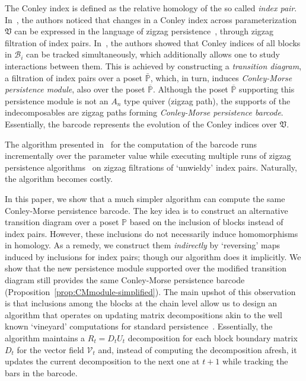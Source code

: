 \documentclass[letterpaper,11pt]{article}
\theoremstyle{plain}
\theoremstyle{definition}
\def\cB{\text{$\mathcal B$}}
\def\cV{\text{$\mathcal V$}}
\def\mathobj#1{\mbox{$#1$}}
\def\PP{\mathobj{\mathbb{P}}}
\newcounter{li}
\newcommand{\zzV}{\mathfrak{V}}
\begin{document}
The Conley index is defined as the relative homology of the so called \emph{index pair}. 
In~\cite{DeLiMrSl2022}, the authors noticed that changes in a Conley index across parameterization $\zzV$ can be expressed in the language of zigzag persistence~\cite{CaSiMo2009-zigzag}, through zigzag filtration of index pairs.
In~\cite{CMbarcodes2025}, the authors showed that Conley indices of all blocks in $\cB_i$ can be tracked simultaneously, which additionally allows one to study interactions between them.
This is achieved by constructing a \emph{transition diagram}, a filtration of index pairs over a poset $\bar{\PP}$, 
    which, in turn, induces \emph{Conley-Morse persistence module}, also over the poset $\overline{\PP}$. 
Although the poset $\overline{\PP}$ supporting this persistence module is not an $A_n$ type quiver (zigzag path),
    the supports of the indecomposables are zigzag paths forming \emph{Conley-Morse persistence barcode}. 
Essentially, the barcode represents the evolution of the Conley indices over $\zzV$.

The algorithm presented in~\cite{CMbarcodes2025} for the computation of the barcode runs incrementally over the parameter value while executing multiple runs of zigzag persistence algorithms~\cite{DW22,milosavljevic2011zigzag} on zigzag filtrations of `unwieldy' index pairs. 
Naturally, the algorithm becomes costly. 

In this paper, we show that a much simpler algorithm can compute the same Conley-Morse
persistence barcode. 
The key idea is to construct an alternative transition diagram over a poset $\PP$ based on the inclusion of blocks instead of index pairs.
However, these inclusions do not necessarily induce homomorphisms in homology.
As a remedy, we construct them \emph{indirectly} by `reversing' maps induced by inclusions for index pairs;
    though our algorithm does it implicitly. 
We show that the new persistence module supported over
    the modified transition diagram still provides the same Conley-Morse persistence barcode (Proposition~\ref{prop:CMmodule-simplified}).
The main upshot of this observation is that inclusions among the blocks at the
chain level allow us to design an algorithm that operates on updating matrix
decompositions akin to the well known `vineyard' computations for standard persistence~\cite{CohEdeMor2006}. 
Essentially, the algorithm maintains a $R_t=D_tU_t$ decomposition for each block boundary matrix $D_t$ for the vector field $\cV_t$ and, instead of
computing the decomposition afresh, it updates the current decomposition to
the next one at $t+1$ while tracking the bars in the barcode.
\end{document}

